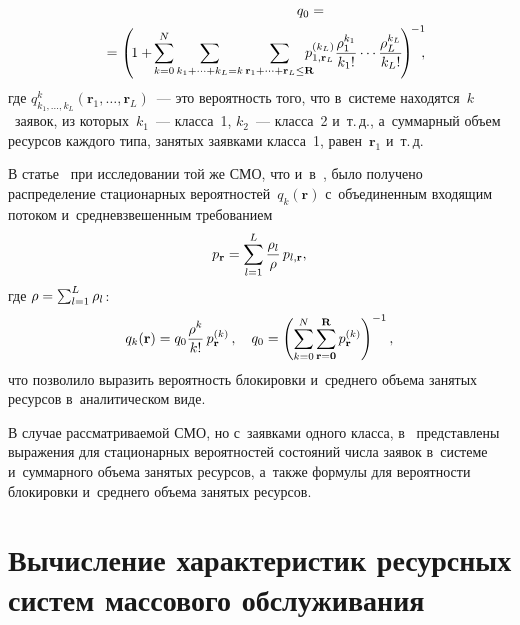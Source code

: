 \begin{multicols}{2}
\vspace*{-12pt}

\noindent
\begin{multline*}
\hspace*{76pt}q_0={}\\
\!{}=\left(\!
\vphantom{\sum\limits_{k=0}^{N}\sum\limits_{k_1+\cdots+k_L=k}
\sum\limits_{\mathbf{r}_1+\cdots+\mathbf{r}_L \leq 
\mathbf{R}} p^{(k_L)}_{1,\mathbf{r}_L}\fr{\rho_1^{k_1}}{k_1!}\cdots
\fr{\rho_L^{k_L}}{k_L!}}
1+ {}\right. 
\left.\!\!\!\sum\limits_{k=0}^{N}\sum\limits_{k_1+\cdots+k_L=k}
\sum\limits_{\mathbf{r}_1+\cdots+\mathbf{r}_L \leq 
\mathbf{R}} \hspace*{-8pt}p^{(k_L)}_{1,\mathbf{r}_L}\fr{\rho_1^{k_1}}{k_1!}\cdots
\fr{\rho_L^{k_L}}{k_L!}
\!\right)^{\!-1}\!\!\!,\hspace*{-8.1138pt}
\end{multline*}
где $q^k_{k_1,\ldots,k_L}(\mathbf{r}_1,\ldots,\mathbf{r}_L)$~--- это вероятность 
того, что в~системе находятся~$k$~заявок, из которых~$k_1$~--- класса~1, 
$k_2$~--- класса~2 и~т.\,д., а~суммарный объем ресурсов каждого типа, занятых заявками 
класса~1, равен~$\mathbf{r}_1$ и~т.\,д.

В статье~\cite{Vihrova_9_2017} при исследовании той же СМО, что 
и~в~\cite{Sopin_7_2016}, было получено распределение стационарных вероятностей~$q_k(\mathbf{r})$ 
с~объединенным входящим потоком и~средневзвешенным требованием 
$$
p_{\mathbf{r}}= \sum\limits_{l=1}^{L} \displaystyle\frac{\displaystyle \rho_l\mathstrut}{\displaystyle \rho\mathstrut} \,p_{l,\mathbf{r}},$$
 где 
$\rho\hm=\sum\nolimits_{l=1}^{L}\rho_l$:
\begin{equation*}
q_k(\mathbf{r})=q_0\displaystyle\frac{\displaystyle \rho^k\mathstrut}{\displaystyle k!\mathstrut}\,p_{\mathbf{r}}^{(k)}\,, \quad q_0=\left( 
\sum\limits_{k=0}^{N}\sum\limits_{\mathbf{r}=\mathbf{0}}^{\mathbf{R}} p_{\mathbf{r}}^{(k)} 
\right)^{-1},
\end{equation*}
что позволило выразить вероятность блокировки и~среднего объема занятых ресурсов 
в~аналитическом виде.

В случае рассматриваемой СМО, но с~заявками одного класса, 
в~\cite{Sopin_11_2017} представлены выражения для стационарных вероятностей 
состояний числа заявок в~системе и~суммарного объема занятых ресурсов, а~также 
формулы для вероятности блокировки и~среднего объема занятых ресурсов.


\section{Вычисление характеристик ресурсных систем массового обслуживания}


\end{multicols}
